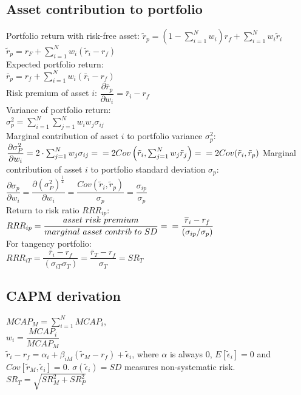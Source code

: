 \subsection*{Asset contribution to portfolio}
Portfolio return with risk-free asset:
$\tilde{r}_p= \left(1-\sum_{i=1}^Nw_i\right)r_f + \sum_{i=1}^Nw_i\tilde{r}_i$\\
$\tilde{r}_p=r_F+\sum_{i=1}^Nw_i(\tilde{r}_i-r_f)$\\
Expected portfolio return:\\
$\bar{r}_p = r_f + \sum_{i=1}^Nw_i(\bar{r}_i - r_f)$\\
Risk premium of asset $i$:
$\dfrac{\partial\bar{r}_p}{\partial w_i} = \bar{r}_i - r_f$\\
Variance of portfolio return:\\
$\sigma_p^2=\sum_{i=1}^N\sum_{j=1}^Nw_iw_j\sigma_{ij}$\\
Marginal contribution of asset $i$ to portfolio variance $\sigma_p^2$:\\
$\dfrac{\partial\sigma_P^2}{\partial w_i} = 2\cdot \sum_{j=1}^Nw_j\sigma_{ij} = \\ = 2Cov\left(\tilde{r}_i,\sum_{j=1}^Nw_j\tilde{r}_j\right) = \\ = 2Cov(\tilde{r}_i,\tilde{r}_p)$
Marginal contribution of asset $i$ to portfolio standard deviation $\sigma_p$:\\
$\dfrac{\partial\sigma_p}{\partial w_i} = \dfrac{\partial(\sigma_P^2)^{\frac{1}{2}}}{\partial w_i} = \dfrac{Cov(\tilde{r}_i,\tilde{r}_p)}{\sigma_p} = \dfrac{\sigma_{ip}}{\sigma_p}$\\
Return to risk ratio $RRR_{ip}$:\\
$RRR_{ip} = \dfrac{asset\ risk\ premium}{marginal\ asset\ contrib\ to\ SD} = \\ = \dfrac{\bar{r}_i-r_f}{(\sigma_{ip}/\sigma_p)}$\\
For tangency portfolio:\\
$RRR_{iT} = \dfrac{\bar{r}_i - r_f}{(\sigma_{iT}\sigma_T)} = \dfrac{\bar{r}_T-r_f}{\sigma_T} = SR_T$\\
\subsection*{CAPM derivation}
$MCAP_M = \sum_{i=1}^NMCAP_i$,\\
$w_i = \dfrac{MCAP_i}{MCAP_M}$\\
$\tilde{r}_i - r_f = \alpha_i + \beta_{iM}(\tilde{r}_M - r_f) + \tilde{\epsilon}_i$, where $\alpha$ is always 0, $E[\tilde{\epsilon}_i] = 0$ and $Cov[\tilde{r}_M, \tilde{\epsilon}_i] = 0$. $\sigma(\tilde{\epsilon}_i) = SD$ measures non-systematic risk.\\
$SR_T=\sqrt{SR_M^2 + SR_P^2}$
